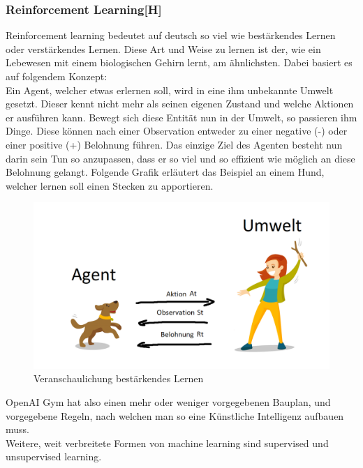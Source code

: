 \subsubsection{Reinforcement Learning[H]}
Reinforcement learning bedeutet auf deutsch so viel wie bestärkendes Lernen oder verstärkendes Lernen.
Diese Art und Weise zu lernen ist der, wie ein Lebewesen mit einem biologischen Gehirn
lernt, am ähnlichsten.
Dabei basiert es auf folgendem Konzept: \\
Ein Agent, welcher etwas erlernen soll, wird in eine ihm unbekannte Umwelt gesetzt. Dieser kennt nicht mehr
als seinen eigenen Zustand und welche Aktionen er ausführen kann. Bewegt sich diese Entität nun in der
Umwelt, so passieren ihm Dinge. Diese können nach einer Observation entweder zu einer negative (-) oder einer
positive (+) Belohnung führen. Das einzige Ziel des Agenten besteht nun darin sein Tun so anzupassen, dass
er so viel und so
effizient wie möglich an diese Belohnung gelangt. Folgende Grafik erläutert das Beispiel an einem Hund,
welcher lernen soll einen Stecken zu apportieren.

\begin{figure}[H]
    \centering
    \includegraphics[scale=0.6]{pics/reinforcementLearningConcept.png}
    \caption{Veranschaulichung bestärkendes Lernen}
\end{figure}

OpenAI Gym hat also einen mehr oder weniger vorgegebenen Bauplan, und vorgegebene Regeln, nach welchen man
so eine Künstliche Intelligenz aufbauen muss. \\
Weitere, weit verbreitete Formen von machine learning sind supervised und unsupervised learning.

